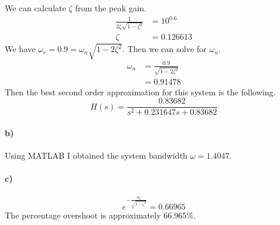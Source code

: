 \documentclass[12pt]{article}
\begin{document}
We can calculate \(\zeta\) from the peak gain.
\begin{align*}
    \frac{1}{2\zeta\sqrt{1-\zeta^2}}&=10^{0.6}\\
    \zeta&=0.126613
\end{align*}
We have \(\omega_r=0.9=\omega_n\sqrt{1-2\zeta^2}\). Then we can solve for \(\omega_n\).
\begin{align*}
    \omega_n&=\frac{0.9}{\sqrt{1-2\zeta^2}}\\
    &=0.91478
\end{align*}
Then the best second order approximation for this system is the following.
\[H(s)=\frac{0.83682}{s^2+0.231647s+0.83682}\]

\paragraph{b)}

Using MATLAB I obtained the system bandwidth \(\omega=1.4047\).

\paragraph{c)}

\[e^{-\frac{\pi\zeta}{\sqrt{1-\zeta^2}}}=0.66965\]
The percentage overshoot is approximately 66.965\%.
\end{document}
